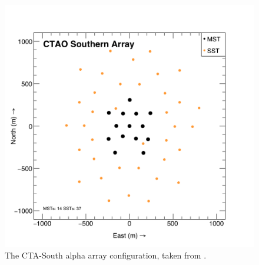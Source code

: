 \begin{figure}[ht!] 
        \centering \includegraphics[width=0.7\columnwidth]{figures/southlayout.png}
        \caption{
                \label{fig:southlayout} %
                The CTA-South alpha array configuration, taken from \cite{zencta}.
        }
\end{figure}
